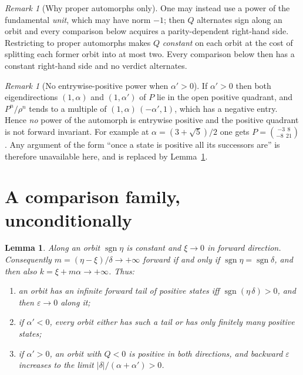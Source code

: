 \documentclass[11pt]{article}
\newtheorem{lemma}[theorem]{Lemma}
\theoremstyle{definition}
\theoremstyle{remark}
\newtheorem{remark}[theorem]{Remark}
\newcommand{\dd}{\delta}
\newcommand{\sgn}{\operatorname{sgn}}
\begin{document}
\begin{remark}[Why proper automorphs only]\label{rem:proper}
One may instead use a power of the fundamental \emph{unit}, which may have norm $-1$; then $Q$
alternates sign along an orbit and every comparison below acquires a parity-dependent
right-hand side. Restricting to proper automorphs makes $Q$ \emph{constant} on each orbit at
the cost of splitting each former orbit into at most two. Every comparison below then has a
constant right-hand side and no verdict alternates.
\end{remark}

\begin{remark}[No entrywise-positive power when $\alpha'>0$]\label{rem:nopos}
If $\alpha'>0$ then both eigendirections $(1,\alpha)$ and $(1,\alpha')$ of $P$ lie in the open
positive quadrant, and $P^{n}/\rho^{n}$ tends to a multiple of $(1,\alpha)\,(-\alpha',1)$, which
has a negative entry. Hence \emph{no} power of the automorph is entrywise positive and the
positive quadrant is not forward invariant. For example at $\alpha=(3+\sqrt5)/2$ one gets
$P=\binom{-3\ \ 8}{-8\ \ 21}$. Any argument of the form ``once a state is positive all its
successors are'' is therefore unavailable here, and is replaced by Lemma~\ref{lem:window}.
\end{remark}

\section{A comparison family, unconditionally}\label{sec:family}

\begin{lemma}\label{lem:window}
Along an orbit $\sgn\eta$ is constant and $\xi\to0$ in forward direction. Consequently
$m=(\eta-\xi)/\dd\to+\infty$ forward if and only if $\sgn\eta=\sgn\dd$, and then also
$k=\xi+m\alpha\to+\infty$. Thus:
\begin{enumerate}\itemsep2pt
\item an orbit has an infinite forward tail of positive states iff $\sgn(\eta\,\dd)>0$, and then
$\varepsilon\to0$ along it;
\item if $\alpha'<0$, every orbit either has such a tail or has only finitely many positive
states;
\item if $\alpha'>0$, an orbit with $Q<0$ is positive in \emph{both} directions, and backward
$\varepsilon$ increases to the limit $|\dd|/(\alpha+\alpha')>0$.
\end{enumerate}
\end{lemma}
\end{document}
